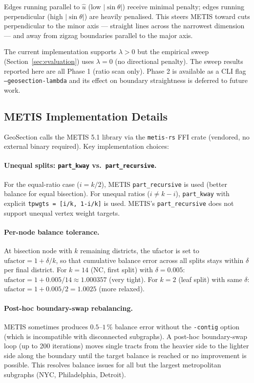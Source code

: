 Edges running parallel to $\hat{u}$ (low $|\!\sin\theta|$) receive minimal
penalty; edges running perpendicular (high $|\!\sin\theta|$) are heavily
penalised.
This steers METIS toward cuts perpendicular to the minor axis --- straight
lines across the narrowest dimension --- and away from zigzag boundaries
parallel to the major axis.

\begin{remark}
The current implementation supports $\lambda > 0$ but the empirical sweep
(Section~\ref{sec:evaluation}) uses $\lambda = 0$ (no directional penalty).
The sweep results reported here are all Phase 1 (ratio scan only).
Phase 2 is available as a CLI flag \texttt{--geosection-lambda} and its
effect on boundary straightness is deferred to future work.
\end{remark}

\subsection{METIS Implementation Details}

GeoSection calls the METIS 5.1 library via the \texttt{metis-rs} FFI crate
(vendored, no external binary required).
Key implementation choices:

\paragraph{Unequal splits: \texttt{part\_kway} vs.\ \texttt{part\_recursive}.}
For the equal-ratio case ($i = k/2$), METIS \texttt{part\_recursive} is used
(better balance for equal bisection).
For unequal ratios ($i \neq k - i$), \texttt{part\_kway} with explicit
\texttt{tpwgts = [i/k, 1-i/k]} is used.
METIS's \texttt{part\_recursive} does not support unequal vertex weight targets.

\paragraph{Per-node balance tolerance.}
At bisection node with $k$ remaining districts, the ufactor is set to
$\mathrm{ufactor} = 1 + \delta / k$, so that cumulative balance error
across all splits stays within $\delta$ per final district.
For $k=14$ (NC, first split) with $\delta=0.005$:
$\mathrm{ufactor} = 1 + 0.005/14 \approx 1.000357$ (very tight).
For $k=2$ (leaf split) with same $\delta$:
$\mathrm{ufactor} = 1 + 0.005/2 = 1.0025$ (more relaxed).

\paragraph{Post-hoc boundary-swap rebalancing.}
METIS sometimes produces $0.5$--$1$\,\% balance error without the
\texttt{-contig} option (which is incompatible with disconnected subgraphs).
A post-hoc boundary-swap loop (up to 200 iterations) moves single tracts
from the heavier side to the lighter side along the boundary until the
target balance is reached or no improvement is possible.
This resolves balance issues for all but the largest metropolitan subgraphs
(NYC, Philadelphia, Detroit).

